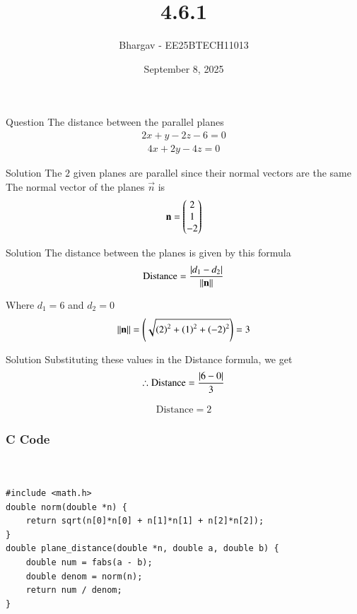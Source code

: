 \documentclass{beamer}
\title{4.6.1}
\date{September 8, 2025}
\author{Bhargav - EE25BTECH11013}
\begin{document}
\frame{\titlepage}

\begin{frame}{Question}
The distance between the parallel planes
\begin{align}
2x + y - 2z - 6 = 0
\end{align}
\begin{align}
4x + 2y - 4z = 0
\end{align}
\end{frame}

\begin{frame}{Solution}
The $2$ given planes are parallel since their normal vectors are the same\\

The normal vector of the planes $\vec{n}$ is
\begin{align}
\mathbf{n} = \begin{pmatrix}2 \\ 1 \\ -2\end{pmatrix}
\end{align}
\end{frame}

\begin{frame}{Solution}
The distance between the planes is given by this formula
\begin{align}
\text{Distance} = \frac{\left\vert d_1 - d_2\right\vert}{\left\lVert\mathbf{n}\right\rVert}
\end{align}

Where $d_1 = 6$ and $d_2 = 0$
\begin{align}
{\left\lVert\mathbf{n}\right\rVert} = \left(\sqrt{\left(2\right)^2 + \left(1\right)^2 + \left(-2\right)^2}\right) = 3
\end{align}

\end{frame}

\begin{frame}{Solution}
Substituting these values in the Distance formula, we get\\
\begin{align}
\therefore \text{Distance} = \frac{\left\vert6-0\right\vert}{3}
\end{align}

\begin{align}
\text{Distance} = 2
\end{align}
\end{frame}



\begin{frame}[fragile]
    \frametitle{C Code }

    \begin{lstlisting}


#include <math.h>
double norm(double *n) {
    return sqrt(n[0]*n[0] + n[1]*n[1] + n[2]*n[2]);
}
double plane_distance(double *n, double a, double b) {
    double num = fabs(a - b);
    double denom = norm(n);
    return num / denom;
}



    \end{lstlisting}
\end{frame}
\end{document}
